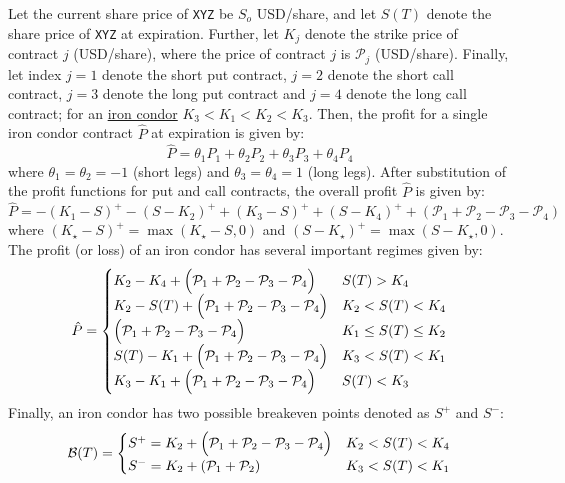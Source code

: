 \documentclass[11pt]{article}
\theoremstyle{definition}
\begin{document}
Let the current share price of \texttt{XYZ} be $S_{o}$ USD/share, and let $S(T)$ denote the share price of \texttt{XYZ} at expiration. 
Further, let $K_{j}$ denote the strike price of contract $j$ (USD/share), where the price of contract $j$ is $\mathcal{P}_{j}$ (USD/share). 
Finally, let index $j=1$ denote the short put contract, $j=2$ denote the short call contract,  $j=3$ denote the long put contract and  $j=4$ denote the long call contract; 
for an \href{https://www.investopedia.com/terms/i/ironcondor.asp}{iron condor} $K_{3} < K_{1} <K_{2} < K_{3}$. 
Then, the profit for a single iron condor contract $\hat{P}$ at expiration is given by:
\begin{equation}
\hat{P} = \theta_{1}P_{1} + \theta_{2}P_{2} + \theta_{3}P_{3} + \theta_{4}P_{4}
\end{equation}
where $\theta_{1}=\theta_{2} = -1$ (short legs) and $\theta_{3}=\theta_{4} = 1$ (long legs). 
After substitution of the profit functions for put and call contracts, the overall profit $\hat{P}$ is given by:
\begin{equation}
\hat{P} = -(K_{1}-S)^{+} - (S-K_{2})^{+} + (K_{3} - S)^{+} + (S-K_{4})^{+} + \left(\mathcal{P}_{1} + \mathcal{P}_{2} - \mathcal{P}_{3}-\mathcal{P}_{4}\right)
\end{equation}
where $(K_{\star}-S)^{+}=\max(K_{\star}-S,0)$ and $(S-K_{\star})^{+} = \max(S-K_{\star},0)$. 
The profit (or loss) of an iron condor has several important regimes given by:
\begin{equation}
\hat{P} = \begin{cases}
  K_{2} - K_{4} + \Bigl(\mathcal{P}_{1} + \mathcal{P}_{2} - \mathcal{P}_{3}-\mathcal{P}_{4}\Bigr)  & S(T)>K_{4} \\
  K_{2} - S(T) + \Bigl(\mathcal{P}_{1} + \mathcal{P}_{2} - \mathcal{P}_{3}-\mathcal{P}_{4}\Bigr)  & K_{2}<S(T)<K_{4} \\
  \Bigl(\mathcal{P}_{1} + \mathcal{P}_{2} - \mathcal{P}_{3}-\mathcal{P}_{4}\Bigr) & K_{1}\leq{S(T)}\leq{K_{2}} \\
  S(T) - K_{1} + \Bigl(\mathcal{P}_{1} + \mathcal{P}_{2} - \mathcal{P}_{3}-\mathcal{P}_{4}\Bigr) & K_{3}<S(T)<K_{1} \\
  K_{3} - K_{1} + \Bigl(\mathcal{P}_{1} + \mathcal{P}_{2} - \mathcal{P}_{3}-\mathcal{P}_{4}\Bigr) & S(T)<K_{3}
\end{cases}
\end{equation}
Finally, an iron condor has two possible breakeven points denoted as $S^{+}$ and $S^{-}$:
\begin{equation}
	\mathcal{B}(T) = \begin{cases}
		S^{+} = K_{2} + \Bigl(\mathcal{P}_{1} + \mathcal{P}_{2} - \mathcal{P}_{3}-\mathcal{P}_{4}\Bigr) & K_{2}<S(T)<K_{4}  \\
		S^{-} = K_{2} + \left(\mathcal{P}_{1}+\mathcal{P}_{2}\right) & K_{3}<S(T)<K_{1}
	\end{cases}
\end{equation}
\end{document}
